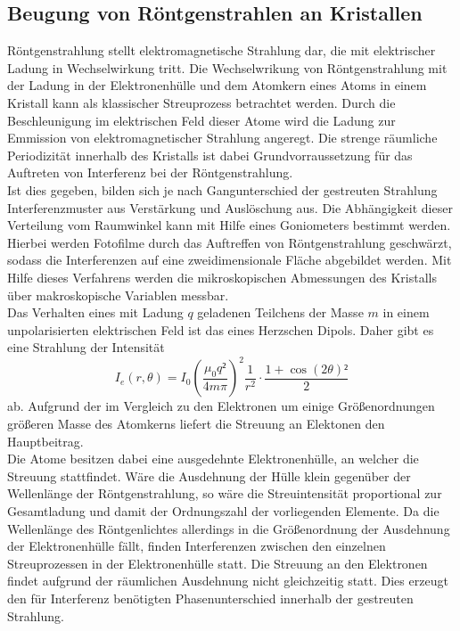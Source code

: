 \subsection{Beugung von Röntgenstrahlen an Kristallen}
%
Röntgenstrahlung stellt elektromagnetische Strahlung dar, die mit elektrischer Ladung in Wechselwirkung tritt. Die Wechselwrikung
von Röntgenstrahlung mit der Ladung in der Elektronenhülle und dem Atomkern eines Atoms in einem Kristall kann als klassischer
Streuprozess betrachtet werden. Durch die Beschleunigung im elektrischen Feld dieser Atome wird die Ladung zur Emmission von
elektromagnetischer Strahlung angeregt. Die strenge räumliche Periodizität innerhalb des Kristalls ist dabei Grundvorraussetzung
für das Auftreten von Interferenz bei der Röntgenstrahlung.\\
Ist dies gegeben, bilden sich je nach Gangunterschied der gestreuten Strahlung Interferenzmuster aus Verstärkung und Auslöschung aus.
Die Abhängigkeit dieser Verteilung vom Raumwinkel kann mit Hilfe eines Goniometers bestimmt werden. Hierbei werden
Fotofilme durch das Auftreffen von Röntgenstrahlung geschwärzt, sodass die Interferenzen auf eine zweidimensionale
Fläche abgebildet werden. Mit Hilfe dieses Verfahrens werden die mikroskopischen Abmessungen des Kristalls über
makroskopische Variablen messbar.\\
Das Verhalten eines mit Ladung $q$ geladenen Teilchens der Masse $m$ in einem unpolarisierten elektrischen Feld ist
das eines Herzschen Dipols. Daher gibt es eine Strahlung der Intensität
%
\begin{equation}
  I_e(r,\theta)=I_0\left(\frac{\mu_0q²}{4m\pi}\right)^2\frac{1}{r^2}\cdot\frac{1+\cos(2\theta)²}{2}
\end{equation}
%
ab. Aufgrund der im Vergleich zu den Elektronen um einige Größenordnungen größeren Masse des Atomkerns liefert die Streuung an
Elektonen den Hauptbeitrag.\\
Die Atome besitzen dabei eine ausgedehnte Elektronenhülle, an welcher die Streuung stattfindet. Wäre die Ausdehnung der
Hülle klein gegenüber der Wellenlänge der Röntgenstrahlung, so wäre die Streuintensität proportional zur Gesamtladung
und damit der Ordnungszahl der vorliegenden Elemente. Da die Wellenlänge des Röntgenlichtes allerdings in die Größenordnung
der Ausdehnung der Elektronenhülle fällt, finden Interferenzen zwischen den einzelnen Streuprozessen in der Elektronenhülle
statt. Die Streuung an den Elektronen findet aufgrund der räumlichen Ausdehnung nicht gleichzeitig statt. Dies erzeugt den
für Interferenz benötigten Phasenunterschied innerhalb der gestreuten Strahlung.\\
